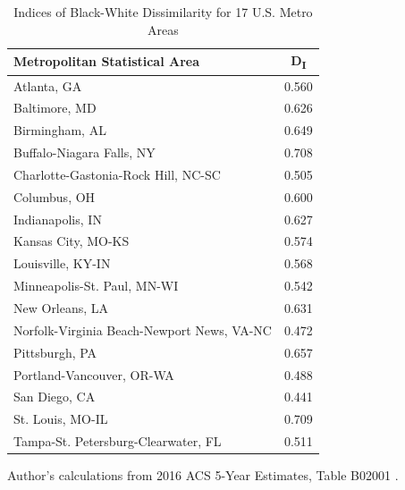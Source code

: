 \documentclass[paper=letter, fontsize=12pt]{scrartcl} %
\begin{document}
	\begin{table}[h]
		\caption{Indices of Black-White Dissimilarity for 17 U.S. Metro Areas}
		\begin{center}
			\begin{tabular}{||l | c||}
				\hline
				\textbf{Metropolitan Statistical Area} & \textbf{D\textsubscript{I}} \\
				\hline \hline
				Atlanta, GA & 0.560 \\
				\hline
				Baltimore, MD & 0.626 \\
				\hline
				Birmingham, AL & 0.649 \\
				\hline
				Buffalo-Niagara Falls, NY & 0.708 \\
				\hline
				Charlotte-Gastonia-Rock Hill, NC-SC & 0.505 \\
				\hline
				Columbus, OH & 0.600 \\
				\hline
				Indianapolis, IN & 0.627 \\
				\hline
				Kansas City, MO-KS & 0.574 \\
				\hline
				Louisville, KY-IN & 0.568 \\
				\hline
				Minneapolis-St. Paul, MN-WI & 0.542 \\
				\hline
				New Orleans, LA & 0.631 \\
				\hline
				Norfolk-Virginia Beach-Newport News, VA-NC & 0.472 \\
				\hline
				Pittsburgh, PA & 0.657 \\
				\hline
				Portland-Vancouver, OR-WA & 0.488 \\
				\hline
				San Diego, CA & 0.441 \\
				\hline
				St. Louis, MO-IL & 0.709 \\
				\hline
				Tampa-St. Petersburg-Clearwater, FL & 0.511 \\
				\hline
			\end{tabular}
		\end{center}
		Author's calculations from 2016 ACS 5-Year Estimates, Table B02001 \cite{acs16}.
	\end{table}
	
\end{document}
